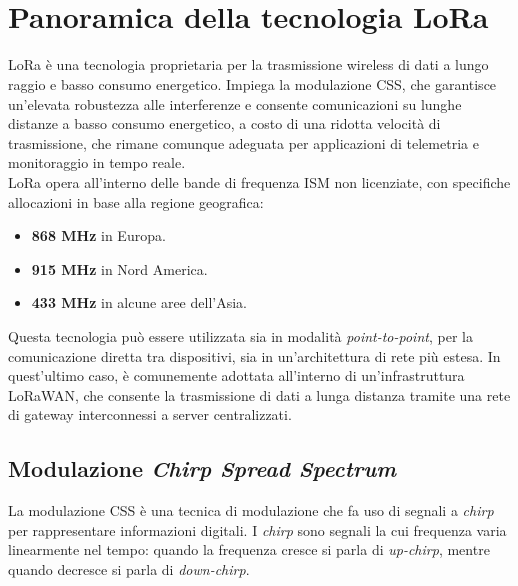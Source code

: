 \documentclass[12pt,a4paper,twoside]{book}
\begin{document}
\section{Panoramica della tecnologia \texorpdfstring{LoRa\textsuperscript{\textcopyright}}{}}
\ac{LoRa} è una tecnologia proprietaria per la trasmissione wireless di dati a
lungo raggio e basso consumo energetico. Impiega la modulazione \ac{CSS},
che garantisce un'elevata robustezza alle interferenze e consente comunicazioni
su lunghe distanze a basso consumo energetico, a costo di una ridotta velocità di trasmissione,
che rimane comunque adeguata per applicazioni di telemetria e monitoraggio
in tempo reale. \\
\ac{LoRa} opera all'interno delle bande di frequenza \ac{ISM} non licenziate,
con specifiche allocazioni in base alla regione geografica:
\begin{itemize}
    \item \textbf{868 MHz} in Europa.
    \item \textbf{915 MHz} in Nord America.
    \item \textbf{433 MHz} in alcune aree dell’Asia.
\end{itemize}

Questa tecnologia può essere utilizzata sia in modalità \emph{point-to-point},
per la comunicazione diretta tra dispositivi, sia in un’architettura di rete più
estesa. In quest'ultimo caso, è comunemente adottata all'interno di
un'infrastruttura \ac{LoRaWAN}, che consente la trasmissione di dati a lunga
distanza tramite una rete di gateway interconnessi a server centralizzati.

\subsection{Modulazione \emph{Chirp Spread Spectrum}}
La modulazione \ac{CSS} è una tecnica di modulazione che fa uso di segnali a
\emph{chirp} per rappresentare informazioni digitali. I \emph{chirp} sono segnali
la cui frequenza varia linearmente nel tempo: quando la frequenza cresce si parla
di \emph{up-chirp}, mentre quando decresce si parla di \emph{down-chirp}.
\end{document}
